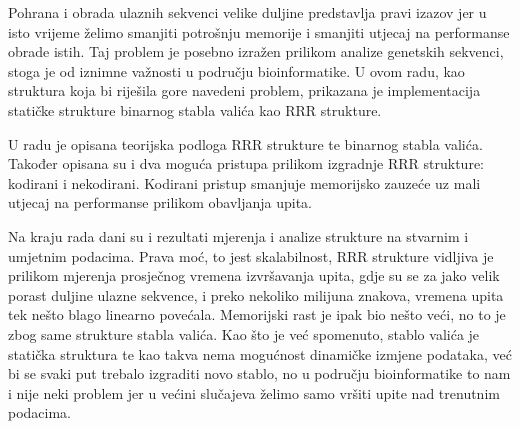 Pohrana i obrada ulaznih sekvenci velike duljine predstavlja pravi izazov jer u isto vrijeme želimo smanjiti potrošnju memorije i smanjiti utjecaj na performanse obrade istih. Taj problem je posebno izražen prilikom analize genetskih sekvenci, stoga je od iznimne važnosti u području bioinformatike. U ovom radu, kao struktura koja bi riješila gore navedeni problem, prikazana je implementacija statičke strukture binarnog stabla valića kao RRR strukture.

U radu je opisana teorijska podloga RRR strukture te binarnog stabla valića. Također opisana su i dva moguća pristupa prilikom izgradnje RRR strukture: kodirani i nekodirani. Kodirani pristup smanjuje memorijsko zauzeće uz mali utjecaj na performanse prilikom obavljanja upita.

Na kraju rada dani su i rezultati mjerenja i analize strukture na stvarnim i umjetnim podacima. Prava moć, to jest skalabilnost, RRR strukture vidljiva je prilikom mjerenja prosječnog vremena izvršavanja upita, gdje su se za jako velik porast duljine ulazne sekvence, i preko nekoliko milijuna znakova, vremena upita tek nešto blago linearno povećala. Memorijski rast je ipak bio nešto veći, no to je zbog same strukture stabla valića. Kao što je već spomenuto, stablo valića je statička struktura te kao takva nema mogućnost dinamičke izmjene podataka, već bi se svaki put trebalo izgraditi novo stablo, no u području bioinformatike to nam i nije neki problem jer u većini slučajeva želimo samo vršiti upite nad trenutnim podacima.